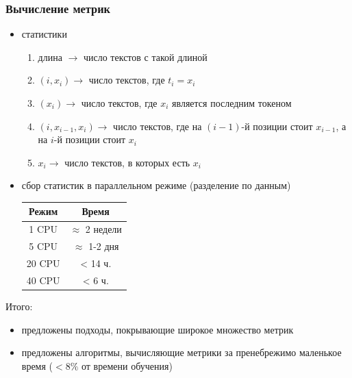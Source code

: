 \documentclass{beamer}
\begin{document}
\begin{frame}
	\frametitle{Вычисление метрик}
	\begin{itemize}
		\item статистики
			\begin{enumerate}
				\item длина $\rightarrow$ число текстов с такой длиной
				\item $(i, x_i) \rightarrow$ число текстов, где $t_i = x_i$ 
				\item $(x_i)\rightarrow$ число текстов, где $x_i$ является последним токеном
				\item $(i, x_{i-1}, x_i) \rightarrow$ число текстов, где на $(i-1)$-й позиции стоит $x_{i-1}$, а на $i$-й позиции стоит $x_i$
				\item $x_i \rightarrow$ число текстов, в которых есть $x_i$
			\end{enumerate}
		\item сбор статистик в параллельном режиме (разделение по данным)
			\begin{table}
				\begin{tabular}{|c|c|}
					\hline
					Режим & Время \\
					\hline
					1 CPU & $\approx$ 2 недели \\
					5 CPU & $\approx$ 1-2 дня \\
					20 CPU & < 14 ч. \\
					40 CPU & < 6 ч. \\
					\hline
				\end{tabular}
			\end{table}
	\end{itemize}
	\noindent\makebox[\linewidth]{\rule{\paperwidth}{0.4pt}}
	Итого:
	\begin{itemize}
		\item предложены подходы, покрывающие широкое множество метрик
		\item предложены алгоритмы, вычисляющие метрики за пренебрежимо маленькое время ($<8\%$ от времени обучения)
	\end{itemize}
\end{frame}
\end{document}
